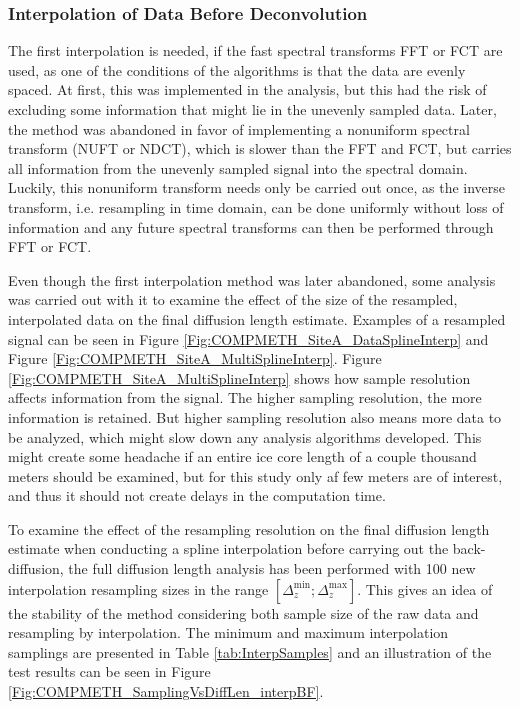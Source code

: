 \documentclass[../../CompleteThesis2/Complete_2ndDraft]{subfiles}
\begin{document}
\subsubsection[Interpolation 1]{Interpolation of Data Before Deconvolution}
\label{Subsubsec:METH_Interpolation_BFdecon}

The first interpolation is needed, if the fast spectral transforms FFT or FCT are used, as one of the conditions of the algorithms is that the data are evenly spaced. At first, this was implemented in the analysis, but this had the risk of excluding some information that might lie in the unevenly sampled data. Later, the method was abandoned in favor of implementing a nonuniform spectral transform (NUFT or NDCT), which is slower than the FFT and FCT, but carries all information from the unevenly sampled signal into the spectral domain. Luckily, this nonuniform transform needs only be carried out once, as the inverse transform, i.e. resampling in time domain, can be done uniformly without loss of information and any future spectral transforms can then be performed through FFT or FCT.

Even though the first interpolation method was later abandoned, some analysis was carried out with it to examine the effect of the size of the resampled, interpolated data on the final diffusion length estimate. Examples of a resampled signal can be seen in Figure \ref{Fig:COMPMETH_SiteA_DataSplineInterp} and Figure \ref{Fig:COMPMETH_SiteA_MultiSplineInterp}. Figure \ref{Fig:COMPMETH_SiteA_MultiSplineInterp} shows how sample resolution affects information from the signal. The higher sampling resolution, the more information is retained. But higher sampling resolution also means more data to be analyzed, which might slow down any analysis algorithms developed. This might create some headache if an entire ice core length of a couple thousand meters should be examined, but for this study only af few meters are of interest, and thus it should not create delays in the computation time.

To examine the effect of the resampling resolution on the final diffusion length estimate when conducting a spline interpolation before carrying out the back-diffusion, the full diffusion length analysis has been performed with 100 new interpolation resampling sizes in the range $[\Delta_z^{\text{min}};\Delta_z^{\text{max}}]$. This gives an idea of the stability of the method considering both sample size of the raw data and resampling by interpolation. The minimum and maximum interpolation samplings are presented in Table \ref{tab:InterpSamples} and an illustration of the test results can be seen in Figure \ref{Fig:COMPMETH_SamplingVsDiffLen_interpBF}. 
\end{document}

